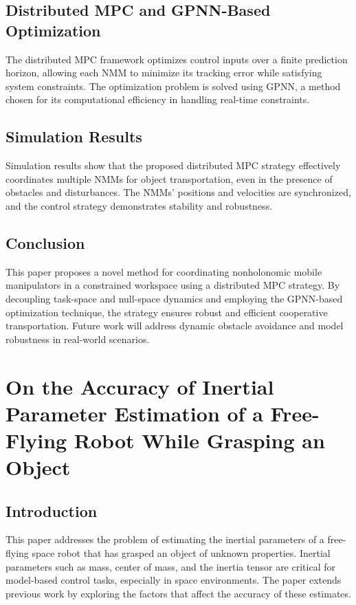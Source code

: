 \documentclass[a4paper,12pt]{article}
\begin{document}
        \subsection{Distributed MPC and GPNN-Based Optimization}
        The distributed MPC framework optimizes control inputs over a finite prediction horizon, allowing each NMM to minimize its tracking error while satisfying system constraints. The optimization problem is solved using GPNN, a method chosen for its computational efficiency in handling real-time constraints.
        
        \subsection{Simulation Results}
        Simulation results show that the proposed distributed MPC strategy effectively coordinates multiple NMMs for object transportation, even in the presence of obstacles and disturbances. The NMMs' positions and velocities are synchronized, and the control strategy demonstrates stability and robustness. 
        
        \subsection{Conclusion}
        This paper proposes a novel method for coordinating nonholonomic mobile manipulators in a constrained workspace using a distributed MPC strategy. By decoupling task-space and null-space dynamics and employing the GPNN-based optimization technique, the strategy ensures robust and efficient cooperative transportation. Future work will address dynamic obstacle avoidance and model robustness in real-world scenarios.

\section{On the Accuracy of Inertial Parameter Estimation of a Free-Flying
Robot While Grasping an Object}


    \subsection{Introduction}
    This paper addresses the problem of estimating the inertial parameters of a free-flying space robot that has grasped an object of unknown properties. Inertial parameters such as mass, center of mass, and the inertia tensor are critical for model-based control tasks, especially in space environments. The paper extends previous work by exploring the factors that affect the accuracy of these estimates.
\end{document}
